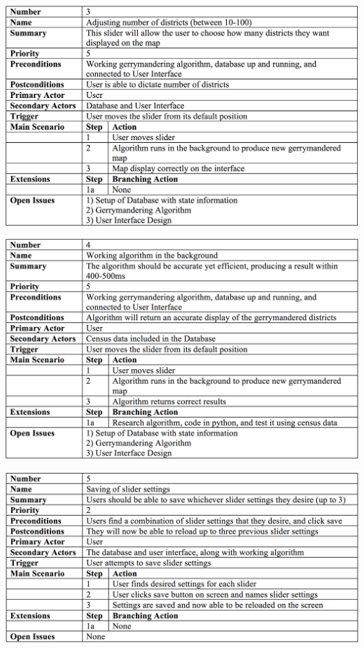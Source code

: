 \documentclass{article}
\begin{document}
\begin{addmargin}[4em]{0em}
\begin{center}
\hspace*{-2cm}      
\includegraphics[scale=.25]{Slider3.png}
\end{center}

\begin{center}
\hspace*{-2cm}      
\includegraphics[scale=.25]{Algorithm.png}
\end{center}

\begin{center}
\hspace*{-2cm}      
\includegraphics[scale=.25]{Saving.png}
\end{center}


\end{addmargin}
\end{document}
